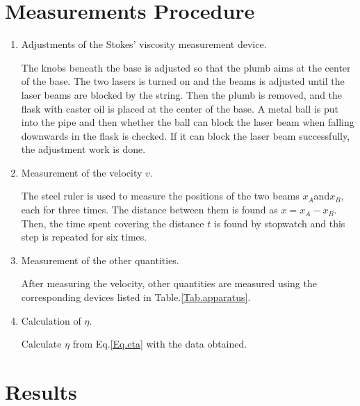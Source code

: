 \documentclass[a4paper]{article}
\begin{document}
		\section{Measurements Procedure}\label{proc}
\begin{enumerate}

\item Adjustments of the Stokes' viscosity measurement device.

The knobs beneath the base is adjusted so that the plumb aims at the center of the base. The two lasers is turned on and the beams is adjusted until the laser beams are blocked by the string. Then the plumb is removed, and the flask with caster oil is placed at the center of the base. A metal ball is put into the pipe and then whether the ball can block the laser beam when falling downwards in the flask is checked. If it can block the laser beam successfully, the adjustment work is done.
 
\item Measurement of the velocity $v$.

The steel ruler is used to measure the positions of the two beams $x_A$and$x_B$, each for three times. The distance between them is found as $x = x_A - x_B$.
Then, the time spent covering the distance $t$ is found by stopwatch and this step is repeated for six times.
 
\item Measurement of the other quantities.

After measuring the velocity, other quantities are measured using the corresponding devices listed in Table.\ref{Tab.apparatus}.

\item Calculation of $\eta$.

Calculate $\eta$ from Eq.\eqref{Eq.eta} with the data obtained.

\end{enumerate}



		\section{Results}
\end{document}
